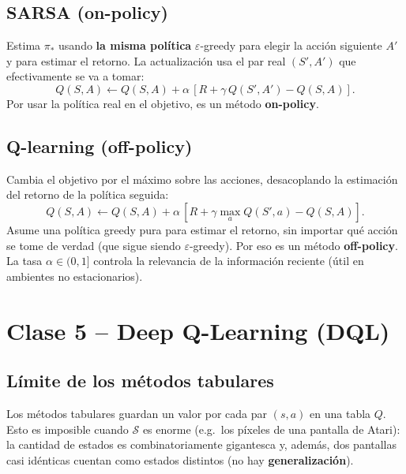 \documentclass[11pt, a4paper]{article}
\begin{document}
\subsection{SARSA (on-policy)}
Estima $\pi_*$ usando \textbf{la misma pol\'itica} $\varepsilon$-greedy para elegir la acci\'on siguiente $A'$ y para estimar el retorno. La actualizaci\'on usa el par real $(S', A')$ que efectivamente se va a tomar:
\[
    Q(S, A) \leftarrow Q(S, A) + \alpha\,[R + \gamma\, Q(S', A') - Q(S, A)].
\]
Por usar la pol\'itica real en el objetivo, es un m\'etodo \textbf{on-policy}.

\subsection{Q-learning (off-policy)}
Cambia el objetivo por el m\'aximo sobre las acciones, desacoplando la estimaci\'on del retorno de la pol\'itica seguida:
\[
    Q(S, A) \leftarrow Q(S, A) + \alpha\,[R + \gamma \max_a Q(S', a) - Q(S, A)].
\]
Asume una pol\'itica greedy pura para estimar el retorno, sin importar qu\'e acci\'on se tome de verdad (que sigue siendo $\varepsilon$-greedy). Por eso es un m\'etodo \textbf{off-policy}. La tasa $\alpha \in (0,1]$ controla la relevancia de la informaci\'on reciente (\'util en ambientes no estacionarios).

\section{Clase 5 -- Deep Q-Learning (DQL)}

\subsection{L\'imite de los m\'etodos tabulares}
Los m\'etodos tabulares guardan un valor por cada par $(s,a)$ en una tabla $Q$. Esto es imposible cuando $\mathcal{S}$ es enorme (e.g.\ los p\'ixeles de una pantalla de Atari): la cantidad de estados es combinatoriamente gigantesca y, adem\'as, dos pantallas casi id\'enticas cuentan como estados distintos (no hay \textbf{generalizaci\'on}).
\end{document}
